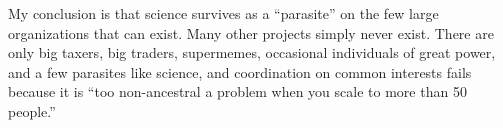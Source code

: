 My conclusion is that science survives as a ``parasite'' on the few large organizations that can exist. Many other projects simply never exist. There are only big taxers, big traders, supermemes, occasional individuals of great power, and a few parasites like science, and coordination on common interests fails because it is ``too non-ancestral a problem when you scale to more than 50 people.''
